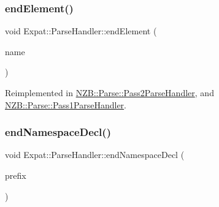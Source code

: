 \hypertarget{class_expat_1_1_parse_handler_a13c775fa36138b4ee429e10b93177bec}{}\label{class_expat_1_1_parse_handler_a13c775fa36138b4ee429e10b93177bec} 
\subsubsection{\texorpdfstring{end\+Element()}{endElement()}}
{\footnotesize\ttfamily void Expat\+::\+Parse\+Handler\+::end\+Element (\begin{DoxyParamCaption}\item[{const X\+M\+L\+\_\+\+Char $\ast$}]{name }\end{DoxyParamCaption})\hspace{0.3cm}{\ttfamily [virtual]}}



Reimplemented in \hyperlink{class_n_z_b_1_1_parse_1_1_pass2_parse_handler_aadec64ab8a4f9bfd7f3b40bd76cce7aa}{N\+Z\+B\+::\+Parse\+::\+Pass2\+Parse\+Handler}, and \hyperlink{class_n_z_b_1_1_parse_1_1_pass1_parse_handler_afbdd1eaa80a10f66cba06a260fd9e7a1}{N\+Z\+B\+::\+Parse\+::\+Pass1\+Parse\+Handler}.

\hypertarget{class_expat_1_1_parse_handler_a143b6a2ac34bbbb46cff621c64d94220}{}\label{class_expat_1_1_parse_handler_a143b6a2ac34bbbb46cff621c64d94220} 
\subsubsection{\texorpdfstring{end\+Namespace\+Decl()}{endNamespaceDecl()}}
{\footnotesize\ttfamily void Expat\+::\+Parse\+Handler\+::end\+Namespace\+Decl (\begin{DoxyParamCaption}\item[{const X\+M\+L\+\_\+\+Char $\ast$}]{prefix }\end{DoxyParamCaption})\hspace{0.3cm}{\ttfamily [virtual]}}

\hypertarget{class_expat_1_1_parse_handler_aee63f888e11cae11314311d240ea3b03}{}\label{class_expat_1_1_parse_handler_aee63f888e11cae11314311d240ea3b03} 

